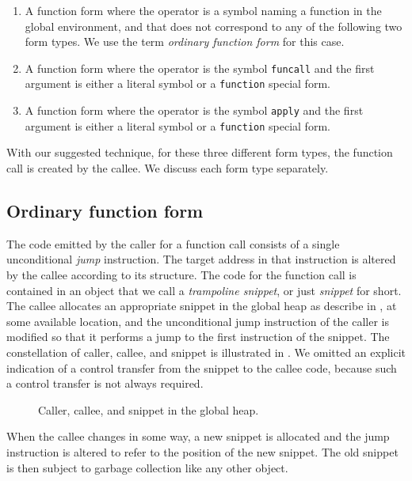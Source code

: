\begin{enumerate}
\item A function form where the operator is a symbol naming a function
  in the global environment, and that does not correspond to any of
  the following two form types.  We use the term \emph{ordinary
    function form} for this case.
\item A function form where the operator is the symbol
  \texttt{funcall} and the first argument is either a literal symbol
  or a \texttt{function} special form.
\item A function form where the operator is the symbol
  \texttt{apply} and the first argument is either a literal symbol
  or a \texttt{function} special form.
\end{enumerate}

With our suggested technique, for these three different form types,
the function call is created by the callee.  We discuss each form type
separately.

\subsection{Ordinary function form}

The code emitted by the caller for a function call consists of a
single unconditional \emph{jump} instruction.  The target address in
that instruction is altered by the callee according to its structure.
The code for the function call is contained in an object that we call
a \emph{trampoline snippet}, or just \emph{snippet} for short.  The
callee allocates an appropriate snippet in the global heap as describe
in , at some available location, and the
unconditional jump instruction of the caller is modified so that it
performs a jump to the first instruction of the snippet.  The
constellation of caller, callee, and snippet is illustrated in
.  We omitted an explicit indication of a control
transfer from the snippet to the callee code, because such a control
transfer is not always required.

\begin{figure}
\begin{center}
\end{center}
\caption{\label{fig-snippet}
Caller, callee, and snippet in the global heap.}
\end{figure}

When the callee changes in some way, a
new snippet is allocated and the jump instruction is altered to refer
to the position of the new snippet.  The old snippet is then subject
to garbage collection like any other object.

